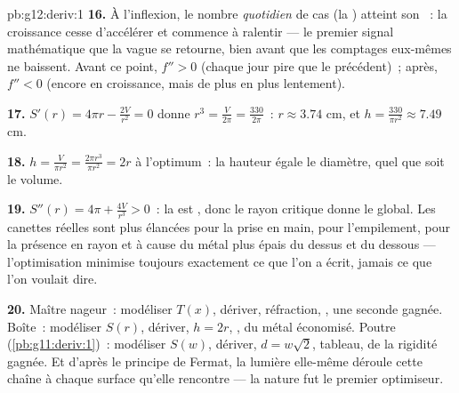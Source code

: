 \begin{solution}{pb:g12:deriv:1}
\textbf{16.} À l'inflexion, le nombre \emph{quotidien} de cas (la
) atteint son ~: la croissance cesse d'accélérer et
commence à ralentir --- le premier signal mathématique que la vague
se retourne, bien avant que les comptages eux-mêmes ne baissent.
Avant ce point, $f'' > 0$ (chaque jour pire que le précédent)~;
après, $f'' < 0$ (encore en croissance, mais de plus en plus
lentement).

\textbf{17.} $S'(r) = 4\pi r - \frac{2V}{r^2} = 0$ donne
$r^3 = \frac{V}{2\pi} = \frac{330}{2\pi}$~: $r \approx 3.74$ cm, et
$h = \frac{330}{\pi r^2} \approx 7.49$ cm.

\textbf{18.} $h = \frac{V}{\pi r^2} = \frac{2\pi r^3}{\pi r^2} = 2r$
à l'optimum~: la hauteur égale le diamètre, quel que soit le
volume.

\textbf{19.} $S''(r) = 4\pi + \frac{4V}{r^3} > 0$~: la  est
, donc le rayon critique donne le  global. Les
canettes réelles sont plus élancées pour la prise en main, pour
l'empilement, pour la présence en rayon et à cause du métal plus
épais du dessus et du dessous --- l'optimisation minimise toujours
exactement ce que l'on a écrit, jamais ce que l'on voulait dire.

\textbf{20.} Maître nageur~: modéliser $T(x)$, dériver, réfraction,
, une seconde gagnée. Boîte~: modéliser $S(r)$, dériver,
$h = 2r$, , du métal économisé. Poutre
(\cref{pb:g11:deriv:1})~: modéliser $S(w)$, dériver,
$d = w\sqrt2$, tableau, de la rigidité gagnée. Et d'après le
principe de Fermat, la lumière elle-même déroule cette chaîne à
chaque surface qu'elle rencontre --- la nature fut le premier
optimiseur.
\end{solution}
